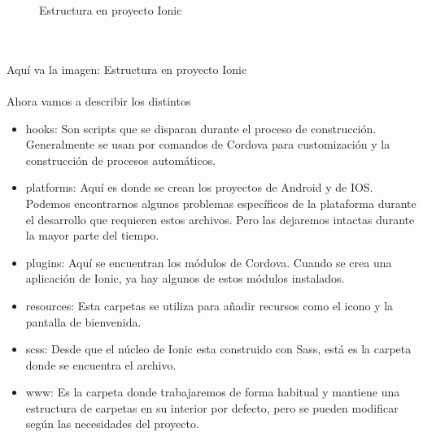 \documentclass[a4paper, 11pt]{article}
\begin{document}
\begin{itemize}
\begin{figure}[H]
                     \caption{Estructura en proyecto Ionic}
                     \label{f:estructura}
              \end{figure}
              \\\\\textcolor[rgb]{1,0,0}{Aquí va la imagen: Estructura en proyecto Ionic}\\\\
            Ahora vamos a describir los distintos
            \begin{itemize}
                \item{hooks: Son scripts que se disparan durante el proceso de
                      construcción. Generalmente se usan por comandos de Cordova
                      para customización y la construcción de procesos automáticos.}
                \item{platforms: Aquí es donde se crean los proyectos de Android y
                      de IOS. Podemos encontrarnos algunos problemas específicos de
                      la plataforma durante el desarrollo que requieren estos
                      archivos. Pero las dejaremos intactas durante la mayor parte
                      del tiempo.}
                \item{plugins: Aquí se encuentran los módulos de Cordova. Cuando se
                      crea una aplicación de Ionic, ya hay algunos de estos módulos
                      instalados.}
                \item{resources: Esta carpetas se utiliza para añadir recursos como
                      el icono y la pantalla de bienvenida.}
                \item{scss: Desde que el núcleo de Ionic esta construido con Sass,
                      está es la carpeta donde se encuentra el archivo.}
                \item{www:  Es la carpeta donde trabajaremos de forma habitual y
                      mantiene una estructura de carpetas en su interior por
                      defecto, pero se pueden modificar según las necesidades del
                      proyecto.}
            \end{itemize}



\end{itemize}
\end{document}
